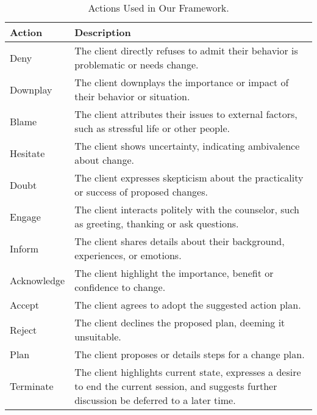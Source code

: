 \begin{table*}[tb]
\centering
\begin{tabularx}{\textwidth}{lX}
\toprule
Action      & Description                                                                                                                                      \\ \midrule
Deny        & The client directly refuses to admit their behavior is problematic or needs change.                                                              \\ \hline
Downplay    & The client downplays the importance or impact of their behavior or situation.                                                                    \\ \hline
Blame       & The client attributes their issues to external factors, such as stressful life or other people.                                                  \\ \hline
Hesitate    & The client shows uncertainty, indicating ambivalence about change.                                                                               \\ \hline
Doubt       & The client expresses skepticism about the practicality or success of proposed changes.                                                           \\ \hline
Engage      & The client interacts politely with the counselor, such as greeting, thanking or ask questions.                                                   \\ \hline
Inform      & The client shares details about their background, experiences, or emotions.                                                                      \\ \hline
Acknowledge & The client highlight the importance, benefit or confidence to change.                                                                            \\ \hline
Accept      & The client agrees to adopt the suggested action plan.                                                                                            \\ \hline
Reject      & The client declines the proposed plan, deeming it unsuitable.                                                                                    \\  \hline
Plan        & The client proposes or details steps for a change plan.                                                                                          \\ \hline
Terminate   & The client highlights current state, expresses a desire to end the current session, and suggests further discussion be deferred to a later time. \\ \bottomrule
\end{tabularx}
\caption{Actions Used in Our Framework.}
\label{tab:action description}
\end{table*}

